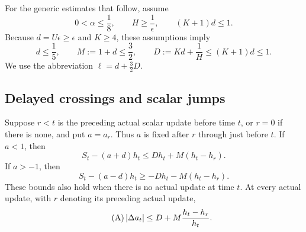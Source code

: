 For the generic estimates that follow, assume
\begin{equation}\label{eq:reward-conditions}
 0<\alpha\le\frac18,\qquad H\ge\frac1\epsilon,
 \qquad (K+1)d\le1.
\end{equation}
Because $d=U\epsilon\ge\epsilon$ and $K\ge4$, these assumptions imply
\[
 d\le\frac15,\qquad M:=1+d\le\frac32,
 \qquad D:=Kd+\frac1H\le(K+1)d\le1.
\]
We use the abbreviation $\ell=d+\tfrac32D$.

\subsection{Delayed crossings and scalar jumps}

\begin{lemma}\label{lem:reward-delay}
Suppose $r<t$ is the preceding actual scalar update before time $t$, or
$r=0$ if there is none, and put $a=a_r$. Thus $a$ is fixed after $r$
through just before $t$. If $a<1$, then
\[
 S_t-(a+d)h_t\le D h_t+M(h_t-h_r).
\]
If $a>-1$, then
\[
 S_t-(a-d)h_t\ge-D h_t-M(h_t-h_r).
\]
These bounds also hold when there is no actual update at time $t$.
At every actual update, with $r$ denoting its preceding actual update,
\begin{equation}\tag{A}\label{eq:reward-A}
 \left|\Delta a_t\right|\le D+M\frac{h_t-h_r}{h_t}.
\end{equation}
\end{lemma}

